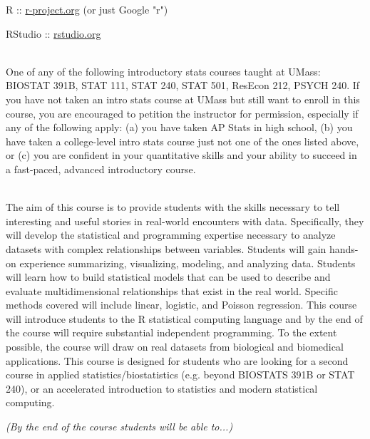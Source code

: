 \documentclass[10pt]{article}
\begin{document}

R :: \href{http://www.r-project.org}{r-project.org} (or just Google "r")

RStudio :: \href{http://www.rstudio.org}{rstudio.org}


\bigskip
{}\\
One of any of the following introductory stats courses taught at UMass: BIOSTAT 391B, STAT 111, STAT 240, STAT 501, ResEcon 212, PSYCH 240. If you have not taken an intro stats course at UMass but still want to enroll in this course, you are encouraged to petition the instructor for permission, especially if any of the following apply: (a) you have taken AP Stats in high school, (b) you have taken a college-level intro stats course just not one of the ones listed above, or (c) you are confident in your quantitative skills and your ability to succeed in a fast-paced, advanced introductory course.


\bigskip
{}\\ 
The aim of this course is to provide students with the skills necessary to tell interesting and useful stories in real-world encounters with data. Specifically, they will develop the statistical and programming expertise necessary to analyze datasets with complex relationships between variables. Students will gain hands-on experience summarizing, visualizing, modeling, and analyzing data. Students will learn how to build statistical models that can be used to describe and evaluate multidimensional relationships that exist in the real world. Specific methods covered will include linear, logistic, and Poisson regression. This course will introduce students to the R statistical computing language and by the end of the course will require substantial independent programming. To the extent possible, the course will draw on real datasets from biological and biomedical applications. This course is designed for students who are looking for a second course in applied statistics/biostatistics (e.g. beyond BIOSTATS 391B or STAT 240), or an accelerated introduction to statistics and modern statistical computing.


\bigskip
{} {\em (By the end of the course students will be able to...)}
\end{document}
